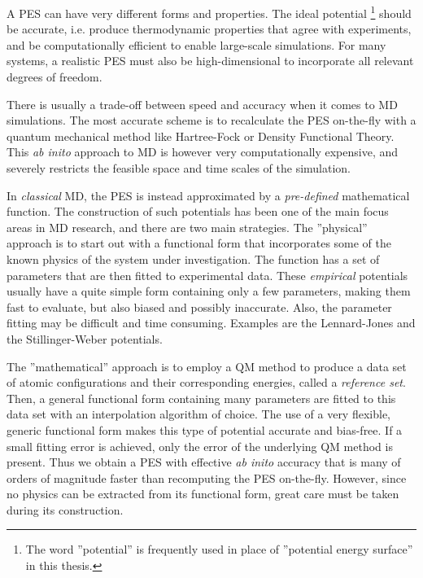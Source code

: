 \documentclass[twoside,english]{uiofysmaster}
\begin{document}
A PES can have very different forms and properties. The ideal potential 
\footnote{The word ''potential'' is frequently used in place of ''potential energy surface'' in this thesis.}
should be accurate, i.e. produce thermodynamic properties that agree with experiments, and be computationally 
efficient to enable large-scale simulations. For many systems, a realistic PES must also be high-dimensional to 
incorporate all relevant degrees of freedom.

There is usually a trade-off between speed and accuracy when it comes to MD simulations. 
The most accurate scheme is to recalculate the PES on-the-fly with a quantum mechanical method like 
Hartree-Fock or Density Functional Theory. 
This \textit{ab inito} approach to MD is however very computationally expensive, 
and severely restricts the feasible space and time scales of the simulation.   

In \textit{classical} MD, the PES is instead approximated by a \textit{pre-defined} mathematical function. 
The construction of such potentials has been one of the main focus areas in MD research, and there 
are two main strategies. The ''physical'' approach is to start out with a functional form 
that incorporates some of the known physics of the system under investigation. 
The function has a set of parameters that are then fitted to experimental data. 
These \textit{empirical} potentials usually have a quite simple form containing only 
a few parameters, making them fast to evaluate, but also biased and possibly inaccurate. Also, the parameter fitting 
may be difficult and time consuming. 
Examples are the Lennard-Jones \cite{Jones24} and the Stillinger-Weber 
\cite{Stillinger85} potentials. 

The ''mathematical'' approach is to employ a QM method to produce a data set of atomic configurations and 
their corresponding energies, called a \textit{reference set}. 
Then, a general functional form containing many parameters are fitted to this data set with 
an interpolation algorithm of choice. The use of a very flexible, generic functional form makes this type of potential 
accurate and bias-free. If a small fitting error is achieved, only the error of the underlying QM method 
is present. Thus we obtain a PES with effective \textit{ab inito} accuracy that is many of orders of magnitude faster 
than recomputing the PES on-the-fly. However, since no physics can be extracted from its functional form, great 
care must be taken during its construction. 
\end{document}
